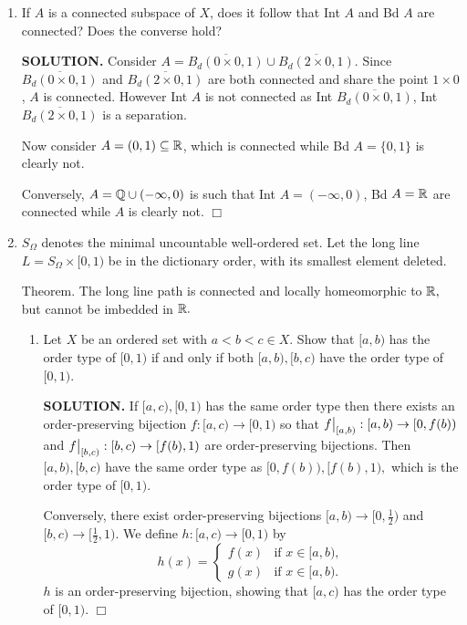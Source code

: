 \documentclass{article}
\begin{document}
\begin{enumerate}
    \item If $A$ is a connected subspace of $X$, does it follow that Int $A$ and Bd $A$ are connected? Does the converse hold?

    {\bf SOLUTION.} Consider $A = \overline{B_d(0 \times 0, 1)} \cup \overline{B_d(2 \times 0, 1)}$. Since $\overline{B_d(0 \times 0, 1)}$ and $\overline{B_d(2 \times 0, 1)}$ are both connected and share the point $1 \times 0$, $A$ is connected. However Int $A$ is not connected as Int $\overline{B_d(0 \times 0, 1)}$, Int $\overline{B_d(2 \times 0, 1)}$ is a separation. 

    Now consider $A = (0, 1) \subseteq \mathbb{R}$, which is connected while Bd $A = \{0,1\}$ is clearly not.

    Conversely, $A = \mathbb{Q} \cup (-\infty, 0)$ is such that Int $A = (-\infty, 0)$, Bd $A = \mathbb{R}$ are connected while $A$ is clearly not. $\Box$

    \item $S_\Omega$ denotes the minimal uncountable well-ordered set. Let the long line $L = S_\Omega \times [0, 1)$ be in the dictionary order, with its smallest element deleted.
    
    Theorem. The long line path is connected and locally homeomorphic to $\mathbb{R},$ but cannot be imbedded in $\mathbb{R}.$ 
    \begin{enumerate}
        \item Let $X$ be an ordered set with $a < b < c \in X$. Show that $[a, b)$ has the order type of $[0, 1)$ if and only if both $[a, b), [b, c)$ have the order type of $[0, 1)$.

        {\bf SOLUTION.} If $[a,c), [0,1)$ has the same order type then there exists an order-preserving bijection $f: [a, c) \rightarrow [0, 1)$ so that $\restr{f}{[a, b)}: [a, b) \rightarrow [0, f(b))$ and $\restr{f}{[b, c)}: [b, c) \rightarrow [f(b), 1)$ are order-preserving bijections. Then $[a, b), [b, c)$ have the same order type as $[0, f(b)), [f(b), 1),$ which is the order type of $[0, 1)$.

        Conversely, there exist order-preserving bijections $[a, b) \rightarrow [0, \frac12)$ and $[b, c) \rightarrow [\frac12, 1)$. We define $h: [a, c) \rightarrow [0, 1)$ by
        $$h(x) = \begin{cases}
            f(x) &\text{if } x \in [a, b), \\
            g(x) &\text{if } x \in [a, b).
        \end{cases}$$
        $h$ is an order-preserving bijection, showing that $[a, c)$ has the order type of $[0, 1)$. $\Box$


\end{enumerate}
\end{enumerate}
\end{document}
